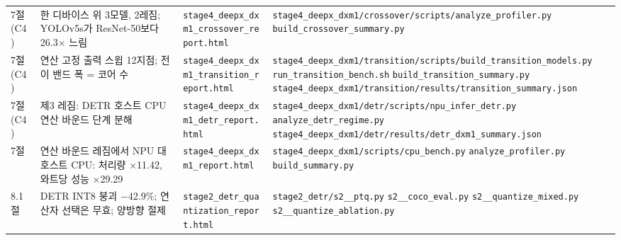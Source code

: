 \documentclass[11pt]{article}
\begin{document}
\begin{longtable}{L{1.2cm} L{3.9cm} L{4.3cm} L{5.0cm}}
\addlinespace[2pt]
7절 (C4) & 한 디바이스 위 3모델, 2레짐; YOLOv5s가 ResNet-50보다 26.3$\times$ 느림 & \texttt{stage4\_\allowbreak deepx\_\allowbreak dxm1\_\allowbreak crossover\_\allowbreak report.html} & \texttt{stage4\_\allowbreak deepx\_\allowbreak dxm1/\allowbreak crossover/\allowbreak scripts/\allowbreak analyze\_\allowbreak profiler.py} \newline \texttt{build\_\allowbreak crossover\_\allowbreak summary.py} \\
\addlinespace[2pt]
7절 (C4) & 연산 고정 출력 스윕 12지점; 전이 밴드 폭 = 코어 수 & \texttt{stage4\_\allowbreak deepx\_\allowbreak dxm1\_\allowbreak transition\_\allowbreak report.html} & \texttt{stage4\_\allowbreak deepx\_\allowbreak dxm1/\allowbreak transition/\allowbreak scripts/\allowbreak build\_\allowbreak transition\_\allowbreak models.py} \newline \texttt{run\_\allowbreak transition\_\allowbreak bench.sh} \newline \texttt{build\_\allowbreak transition\_\allowbreak summary.py} \newline \texttt{stage4\_\allowbreak deepx\_\allowbreak dxm1/\allowbreak transition/\allowbreak results/\allowbreak transition\_\allowbreak summary.json} \\
\addlinespace[2pt]
7절 (C4) & 제3 레짐: DETR 호스트 CPU 연산 바운드 단계 분해 & \texttt{stage4\_\allowbreak deepx\_\allowbreak dxm1\_\allowbreak detr\_\allowbreak report.html} & \texttt{stage4\_\allowbreak deepx\_\allowbreak dxm1/\allowbreak detr/\allowbreak scripts/\allowbreak npu\_\allowbreak infer\_\allowbreak detr.py} \newline \texttt{analyze\_\allowbreak detr\_\allowbreak regime.py} \newline \texttt{stage4\_\allowbreak deepx\_\allowbreak dxm1/\allowbreak detr/\allowbreak results/\allowbreak detr\_\allowbreak dxm1\_\allowbreak summary.json} \\
\addlinespace[2pt]
7절 & 연산 바운드 레짐에서 NPU 대 호스트 CPU: 처리량 $\times$11.42, 와트당 성능 $\times$29.29 & \texttt{stage4\_\allowbreak deepx\_\allowbreak dxm1\_\allowbreak report.html} & \texttt{stage4\_\allowbreak deepx\_\allowbreak dxm1/\allowbreak scripts/\allowbreak cpu\_\allowbreak bench.py} \newline \texttt{analyze\_\allowbreak profiler.py} \newline \texttt{build\_\allowbreak summary.py} \\
\addlinespace[2pt]
8.1절 & DETR INT8 붕괴 $-$42.9\%; 연산자 선택은 무효; 양방향 절제 & \texttt{stage2\_\allowbreak detr\_\allowbreak quantization\_\allowbreak report.html} & \texttt{stage2\_\allowbreak detr/\allowbreak s2\_\_\allowbreak ptq.py} \newline \texttt{s2\_\_\allowbreak coco\_\allowbreak eval.py} \newline \texttt{s2\_\_\allowbreak quantize\_\allowbreak mixed.py} \newline \texttt{s2\_\_\allowbreak quantize\_\allowbreak ablation.py} \\

\end{longtable}
\end{document}
